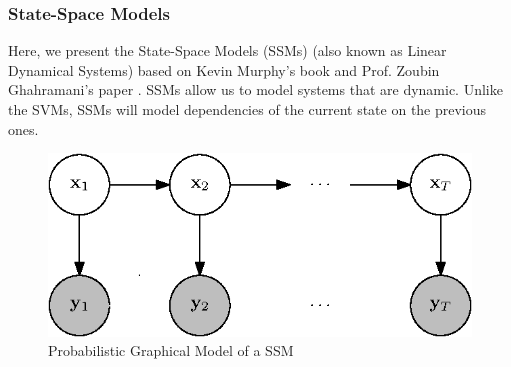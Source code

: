 \subsubsection*{State-Space Models}

	Here, we present the State-Space Models (SSMs) (also known as Linear Dynamical Systems) based on Kevin Murphy's book \cite[Chapter 18]{mlBook} and Prof. Zoubin Ghahramani's paper \cite{ghahramani2000variational}. SSMs allow us to model systems that are dynamic. Unlike the SVMs, SSMs will model dependencies of the current state on the previous ones.
	
	\begin{figure}[h!]
		\centering
			\includegraphics{drawings/pgm.eps}
		\caption{Probabilistic Graphical Model of a SSM}
		\label{fig:pgm}
	\end{figure}
	
